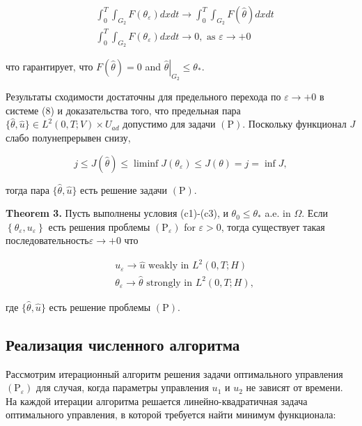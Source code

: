 \[
    \begin{aligned}
        &\int_{0}^{T} \int_{G_{2}} F\left(\theta_{\varepsilon}\right) d x d t
        \rightarrow \int_{0}^{T} \int_{G_{2}} F(\widehat{\theta}) d x d t \\
        &\int_{0}^{T} \int_{G_{2}} F\left(\theta_{\varepsilon}\right) d x d t
        \rightarrow 0, \text { as } \varepsilon \rightarrow+0
    \end{aligned}
\]

что гарантирует, что $F(\widehat{\theta})=0$ and $\left.\widehat{\theta}\right|_{G_{2}} \leq \theta_{*}$.

Результаты сходимости достаточны для предельного перехода по $\varepsilon \rightarrow+0$ в системе (8)
и доказательства того, что предельная пара
$\{\widehat{\theta}, \widehat{u}\} \in L ^{2}(0, T ; V) \times U_{a d}$
допустимо для задачи $(\mathrm{P})$.
Поскольку функционал $J$ слабо полунепрерывен снизу,

\[
    j \leq J(\widehat{\theta}) \leq \liminf J\left(\theta_{\varepsilon}\right) \leq J(\theta)=j=\inf J,
\]

тогда пара $\{\widehat{\theta}, \widehat{u}\}$ есть решение задачи $(\mathrm{P})$.

\textbf{Theorem 3.}
Пусть выполнены условия (c1)-(c3), и $\theta_{0} \leq \theta_{*}$ a.e. in $\Omega$.
Если $\left\{\theta_{\varepsilon}, u_{\varepsilon}\right\}$ есть решения проблемы
$\left(\mathrm{P}_{\varepsilon}\right)$ for $\varepsilon>0$, тогда существует
такая последовательность$\varepsilon \rightarrow+0$ что


\[
    \begin{aligned}
        &u_{\varepsilon} \rightarrow \widehat{u} \text { weakly in } L^{2}(0, T ; H) \\
        &\theta_{\varepsilon} \rightarrow \widehat{\theta} \text { strongly in } L^{2}(0, T ; H),
    \end{aligned}
\]


где $\{\widehat{\theta}, \widehat{u}\}$ есть решение проблемы $(\mathrm{P})$.

\subsection{Реализация численного алгоритма}

Рассмотрим итерационный алгоритм решения задачи оптимального управления
$\left(\mathrm{P}_{\varepsilon}\right)$ для случая, когда параметры управления
$u_{1}$ и $u_{2}$ не зависят от времени.
На каждой итерации алгоритма
решается линейно-квадратичная задача оптимального управления, в которой требуется найти минимум функционала:

